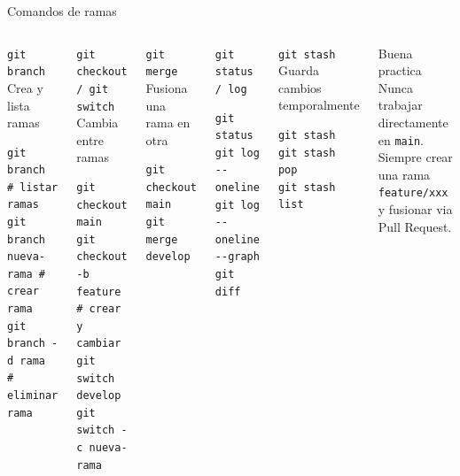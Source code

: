 \documentclass[aspectratio=169]{beamer}
\begin{document}
\begin{frame}[fragile]{Comandos de ramas}
  \begin{columns}
      \begin{exampleblock}{\texttt{git branch}}
        Crea y lista ramas
        \begin{lstlisting}[style=bash]
git branch            # listar ramas
git branch nueva-rama # crear rama
git branch -d rama    # eliminar rama
        \end{lstlisting}
      \end{exampleblock}

      \vspace{0.2cm}

      \begin{exampleblock}{\texttt{git checkout / git switch}}
        Cambia entre ramas
        \begin{lstlisting}[style=bash]
git checkout main
git checkout -b feature  # crear y cambiar
git switch develop
git switch -c nueva-rama
        \end{lstlisting}
      \end{exampleblock}

      \vspace{0.2cm}

      \begin{exampleblock}{\texttt{git merge}}
        Fusiona una rama en otra
        \begin{lstlisting}[style=bash]
git checkout main
git merge develop
        \end{lstlisting}
      \end{exampleblock}

      \begin{exampleblock}{\texttt{git status / log}}
        \begin{lstlisting}[style=bash]
git status
git log --oneline
git log --oneline --graph
git diff
        \end{lstlisting}
      \end{exampleblock}

      \vspace{0.2cm}

      \begin{exampleblock}{\texttt{git stash}}
        Guarda cambios temporalmente
        \begin{lstlisting}[style=bash]
git stash
git stash pop
git stash list
        \end{lstlisting}
      \end{exampleblock}

      \vspace{0.2cm}

      \begin{block}{Buena practica}
        Nunca trabajar directamente en \texttt{main}.
        Siempre crear una rama \texttt{feature/xxx}
        y fusionar via Pull Request.
      \end{block}
  \end{columns}
\end{frame}
\end{document}
